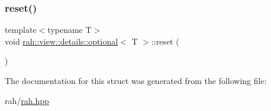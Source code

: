 \mbox{\label{structrah_1_1view_1_1details_1_1optional_a3df63c25ba76b31c003c2faa70554ae7}} 
\subsubsection{\texorpdfstring{reset()}{reset()}}
{\footnotesize\ttfamily template$<$typename T$>$ \\
void \mbox{\hyperlink{structrah_1_1view_1_1details_1_1optional}{rah\+::view\+::details\+::optional}}$<$ T $>$\+::reset (\begin{DoxyParamCaption}{ }\end{DoxyParamCaption})\hspace{0.3cm}{\ttfamily [inline]}}



The documentation for this struct was generated from the following file\+:\begin{DoxyCompactItemize}
\item 
rah/\mbox{\hyperlink{rah_8hpp}{rah.\+hpp}}\end{DoxyCompactItemize}
